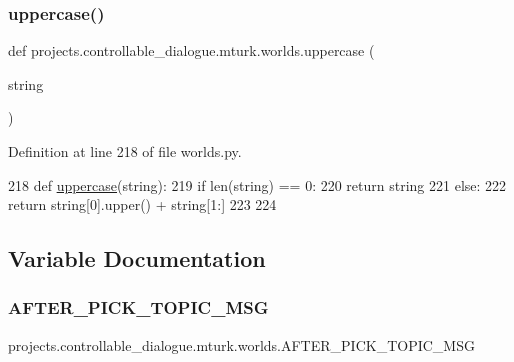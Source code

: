 \subsubsection{\texorpdfstring{uppercase()}{uppercase()}}
{\footnotesize\ttfamily def projects.\+controllable\+\_\+dialogue.\+mturk.\+worlds.\+uppercase (\begin{DoxyParamCaption}\item[{}]{string }\end{DoxyParamCaption})}



Definition at line 218 of file worlds.\+py.


\begin{DoxyCode}
218 \textcolor{keyword}{def }\hyperlink{namespaceprojects_1_1controllable__dialogue_1_1mturk_1_1worlds_a661f3cc70180bbd2379e66e5844f7900}{uppercase}(string):
219     \textcolor{keywordflow}{if} len(string) == 0:
220         \textcolor{keywordflow}{return} string
221     \textcolor{keywordflow}{else}:
222         \textcolor{keywordflow}{return} string[0].upper() + string[1:]
223 
224 
\end{DoxyCode}


\subsection{Variable Documentation}
\mbox{\label{namespaceprojects_1_1controllable__dialogue_1_1mturk_1_1worlds_ad1b5e89172f176651800aa7778efb59c}} 
\subsubsection{\texorpdfstring{A\+F\+T\+E\+R\+\_\+\+P\+I\+C\+K\+\_\+\+T\+O\+P\+I\+C\+\_\+\+M\+SG}{AFTER\_PICK\_TOPIC\_MSG}}
{\footnotesize\ttfamily projects.\+controllable\+\_\+dialogue.\+mturk.\+worlds.\+A\+F\+T\+E\+R\+\_\+\+P\+I\+C\+K\+\_\+\+T\+O\+P\+I\+C\+\_\+\+M\+SG}



